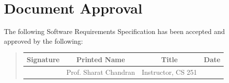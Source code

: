 \documentclass{article}
\begin{document}
    \section{Document Approval}

    The following Software Requirements Specification has been accepted and approved by the following:
    \begin{quote}
        \begin{tabular}{ |c|c|c|c| }
         \hline
         \textbf{Signature}&\textbf{Printed Name}&\textbf{Title}&\textbf{Date}\\
         \hline 
          & Prof. Sharat Chandran & Instructor, CS 251 &\\
         \hline
        \end{tabular}
    \end{quote}
\end{document}
